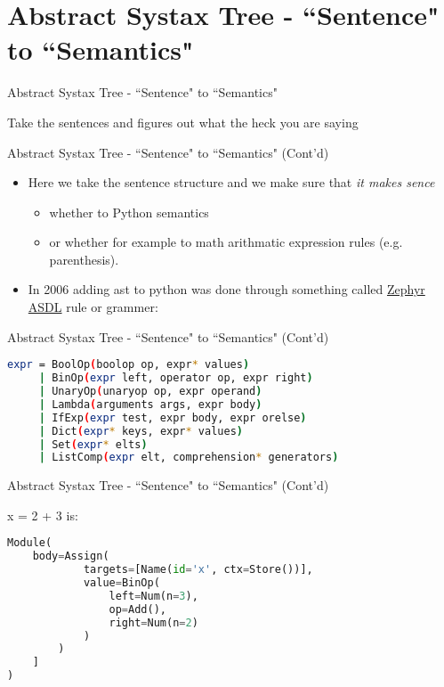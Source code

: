 \section{Abstract Systax Tree - ``Sentence" to ``Semantics"}
\begin{frame}{Abstract Systax Tree - ``Sentence" to ``Semantics"}
\begin{itemize}
{\LARGE \item[-] Take the sentences and figures out what the heck you are saying}
\end{itemize}
\end{frame}

\begin{frame}{Abstract Systax Tree - ``Sentence" to ``Semantics" (Cont'd)}
\begin{itemize}
\item[-]<1-> Here we take the sentence structure and we make sure that \textit{it makes sence}

\begin{itemize}
\item<2-> whether to Python
semantics
\item<3-> or whether for example to math arithmatic expression rules (e.g. parenthesis).
\end{itemize}

\item[-]<4> In 2006 adding ast to python was done through something called \href{https://asdl.sourceforge.net/}{Zephyr ASDL} rule or grammer: 
\end{itemize}
\end{frame}

\begin{frame}[fragile]{Abstract Systax Tree - ``Sentence" to ``Semantics" (Cont'd)}
\begin{flushleft}
\begin{lstlisting}[language=bash]
expr = BoolOp(boolop op, expr* values)
     | BinOp(expr left, operator op, expr right)
     | UnaryOp(unaryop op, expr operand)
     | Lambda(arguments args, expr body)
     | IfExp(expr test, expr body, expr orelse)
     | Dict(expr* keys, expr* values)
     | Set(expr* elts)
     | ListComp(expr elt, comprehension* generators)
\end{lstlisting}
\end{flushleft}
\end{frame}

\begin{frame}[fragile]{Abstract Systax Tree - ``Sentence" to ``Semantics" (Cont'd)}
\begin{flushleft}
{\ttfamily x = 2 + 3} is:
\begin{lstlisting}[language=python]
Module(
    body=Assign(
            targets=[Name(id='x', ctx=Store())], 
            value=BinOp(
                left=Num(n=3), 
                op=Add(), 
                right=Num(n=2)
            )
        )
    ]
)
\end{lstlisting}
\end{flushleft}
\end{frame}
